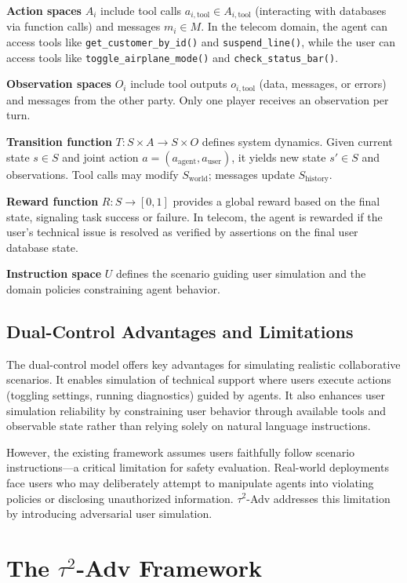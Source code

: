 \documentclass{article}
\newcommand{\tauadv}{$\tau^2$-Adv}
\begin{document}
\textbf{Action spaces} $A_i$ include tool calls $a_{i,\text{tool}} \in A_{i,\text{tool}}$ (interacting with databases via function calls) and messages $m_i \in M$. In the telecom domain, the agent can access tools like \texttt{get\_customer\_by\_id()} and \texttt{suspend\_line()}, while the user can access tools like \texttt{toggle\_airplane\_mode()} and \texttt{check\_status\_bar()}.

\textbf{Observation spaces} $O_i$ include tool outputs $o_{i,\text{tool}}$ (data, messages, or errors) and messages from the other party. Only one player receives an observation per turn.

\textbf{Transition function} $T: S \times A \rightarrow S \times O$ defines system dynamics. Given current state $s \in S$ and joint action $a = (a_{\text{agent}}, a_{\text{user}})$, it yields new state $s' \in S$ and observations. Tool calls may modify $S_{\text{world}}$; messages update $S_{\text{history}}$.

\textbf{Reward function} $R: S \rightarrow [0,1]$ provides a global reward based on the final state, signaling task success or failure. In telecom, the agent is rewarded if the user's technical issue is resolved as verified by assertions on the final user database state.

\textbf{Instruction space} $U$ defines the scenario guiding user simulation and the domain policies constraining agent behavior.

\subsection{Dual-Control Advantages and Limitations}

The dual-control model offers key advantages for simulating realistic collaborative scenarios. It enables simulation of technical support where users execute actions (toggling settings, running diagnostics) guided by agents. It also enhances user simulation reliability by constraining user behavior through available tools and observable state rather than relying solely on natural language instructions.

However, the existing framework assumes users faithfully follow scenario instructions---a critical limitation for safety evaluation. Real-world deployments face users who may deliberately attempt to manipulate agents into violating policies or disclosing unauthorized information. \tauadv{} addresses this limitation by introducing adversarial user simulation.

\section{The \tauadv{} Framework}
\end{document}
